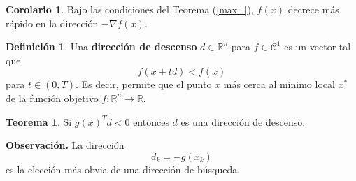 \documentclass[11pt,letterpaper]{article}
\theoremstyle{definition}
\newtheorem{defi}{Definición}[section]%
\theoremstyle{definition}
\newtheorem{teo}{Teorema}[section]%
\theoremstyle{definition}
\newtheorem{col}{Corolario}[section]
\begin{document}
\begin{col}
	Bajo las condiciones del Teorema (\ref{max_}), $ f(x) $ decrece más rápido en la dirección $ - \nabla f(x) $.
\end{col}

\begin{shaded*}
\begin{defi}
	Una \textbf{dirección de descenso} $ d \in \mathbb{R}^n $ para $ f \in \mathcal{C}^1 $ es un vector tal que
	\[ f(x + t d) < f(x) \]
	para $ t \in (0, T) $. Es decir, permite que el punto $ x $ más cerca al mínimo local $ x^* $ de la función objetivo $ f: \mathbb{R}^n \to \mathbb{R} $.
\end{defi}
\end{shaded*}

\begin{shaded*}
\begin{teo}
	Si $ g(x)^T d < 0 $ entonces $ d $ es una dirección de descenso.
\end{teo}
\end{shaded*}
\textbf{Observación.} La dirección 
\[ d_k = - g(x_k) \]
es la elección más obvia de una dirección de búsqueda.
\end{document}
